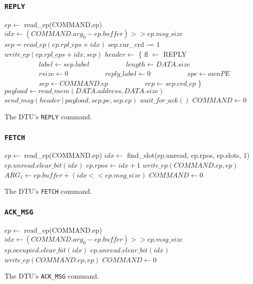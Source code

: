 \documentclass[a4paper,11pt,draft]{article}
\begin{document}
\subsubsection{\texttt{REPLY}}

\begin{algorithm}[H]
    $ep \gets$ read\_ep(COMMAND.ep)\;
    \BlankLine
    $idx \gets (COMMAND.arg_0 - ep.buffer) >> ep.msg\_size$\;
    $sep = read\_ep(ep.rpl\_eps + idx)$\;
    \BlankLine
    sep.cur\_crd -= 1\;
    $write\_ep(ep.rpl\_eps + idx, sep)$\;
    \BlankLine
    $header \gets$ \{ fl $\gets$ REPLY\;
    $\quad\quad\quad\quad\quad label \gets sep.label$\;
    $\quad\quad\quad\quad\quad length \gets DATA.size$\;
    $\quad\quad\quad\quad\quad rsize \gets 0$\;
    $\quad\quad\quad\quad\quad reply\_label \gets 0$\;
    $\quad\quad\quad\quad\quad spe \gets ownPE$\;
    $\quad\quad\quad\quad\quad sep \gets COMMAND.ep$\;
    $\quad\quad\quad\quad\quad rep \gets sep.crd\_ep$ \}\;
    $payload \gets read\_mem(DATA.address, DATA.size)$\;
    $send\_msg(header\ |\ payload, sep.pe, sep.ep)$\;
    $wait\_for\_ack()$\;
    \BlankLine
    $COMMAND \gets 0$\;
    \caption{The DTU's \texttt{REPLY} command.}
\end{algorithm}

\subsubsection{\texttt{FETCH}}

\begin{algorithm}[H]
    $ep \gets$ read\_ep(COMMAND.ep)\;
    \BlankLine
    $idx \gets$ find\_slot(ep.unread, ep.rpos, ep.slots, 1)\;
    $ep.unread.clear\_bit(idx)$\;
    $ep.rpos \gets idx + 1$\;
    $write\_ep(COMMAND.ep, ep)$\;
    \BlankLine
    $ARG_1 \gets ep.buffer + (idx << ep.msg\_size)$\;
    $COMMAND \gets 0$\;
    \caption{The DTU's \texttt{FETCH} command.}
\end{algorithm}

\subsubsection{\texttt{ACK\_MSG}}

\begin{algorithm}[H]
    $ep \gets$ read\_ep(COMMAND.ep)\;
    \BlankLine
    $idx \gets (COMMAND.arg_0 - ep.buffer) >> ep.msg\_size$\;
    $ep.occupied.clear\_bit(idx)$\;
    $ep.unread.clear\_bit(idx)$\;
    $write\_ep(COMMAND.ep, ep)$\;
    \BlankLine
    \BlankLine
    $COMMAND \gets 0$\;
    \caption{The DTU's \texttt{ACK\_MSG} command.}
\end{algorithm}
\end{document}
